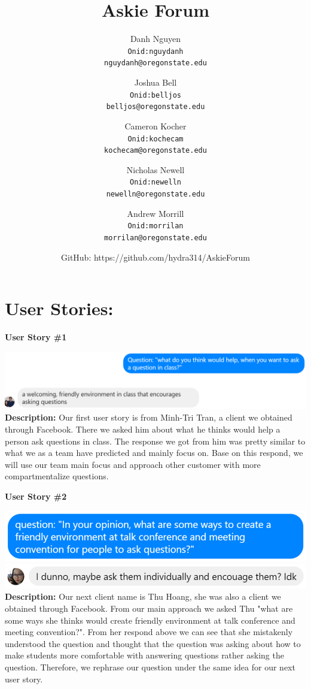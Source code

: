 \documentclass[12pt]{article}
\title{Askie Forum}
\author{
         Danh Nguyen\\
         \texttt{Onid:nguydanh}\\
         \texttt{nguydanh@oregonstate.edu}
         \and
         Joshua Bell\\
         \texttt{Onid:belljos}\\
         \texttt{belljos@oregonstate.edu}
         \and
         Cameron Kocher\\
         \texttt{Onid:kochecam}\\
         \texttt{kochecam@oregonstate.edu}
         \and
         Nicholas Newell\\
         \texttt{Onid:newelln}\\
         \texttt{newelln@oregonstate.edu}
         \and
         Andrew Morrill\\
         \texttt{Onid:morrilan}\\
         \texttt{morrilan@oregonstate.edu}
         \and
         GitHub: https://github.com/hydra314/AskieForum
    }
\begin{document}
\maketitle

\tableofcontents
\section{User Stories:}
\textbf{User Story \#1}
\begin{flushleft}
\includegraphics[width=\textwidth]{Assignment5_userstory_1.eps}
\textbf{Description:} Our first user story is from Minh-Tri Tran, a client we obtained through Facebook. There we asked him about what he thinks would help a person ask questions in class. The response we got from him was pretty similar to what we as a team have predicted and mainly focus on. Base on this respond, we will use our team main focus and approach other customer with more compartmentalize questions.\newline
\end{flushleft}

\textbf{User Story \#2}
\begin{flushleft}
\includegraphics[width=\textwidth]{Assignment5_userstory_2a.eps}
\includegraphics[width=\textwidth]{Assignment5_userstory_2b.eps}
\textbf{Description:} Our next client name is Thu Hoang, she was also a client we obtained through Facebook. From our main approach we asked Thu "what are some ways she thinks would create friendly environment at talk conference and meeting convention?". From her respond above we can see that she mistakenly understood the question and thought that the question was asking about how to make students more comfortable with answering questions rather asking the question. Therefore, we rephrase our question under the same idea for our next user story.\newline
\end{flushleft}
\end{document}
